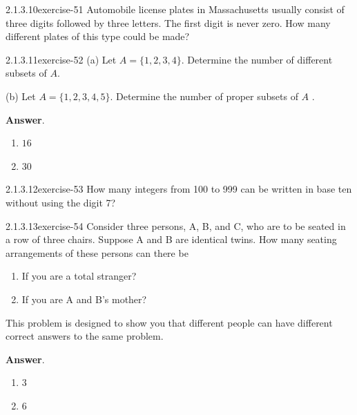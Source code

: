 \documentclass[twoside,10pt,]{book}
\numberwithin{equation}{section}
\begin{document}
\begin{divisionsolution}{2.1.3.10}{}{exercise-51}%
\hypertarget{p-599}{}%
Automobile license plates in Massachusetts usually consist of three digits followed by three letters. The first digit is never zero. How many different plates of this type could be made?%
\end{divisionsolution}%
\begin{divisionsolution}{2.1.3.11}{}{exercise-52}%
\hypertarget{p-600}{}%
(a) Let \(A = \{1, 2, 3, 4\}\). Determine the number of different subsets of \(A\).%
\par
\hypertarget{p-601}{}%
(b) Let \(A = \{1, 2, 3, 4, 5\}\). Determine the number of proper subsets of \(A\) .%
\par\smallskip%
\noindent\textbf{Answer}.\quad%
\hypertarget{p-602}{}%
\leavevmode%
\begin{multicols}{2}
\begin{enumerate}[label=(\alph*)]
\item\hypertarget{li-402}{}\hypertarget{p-603}{}%
\(16\)%
\item\hypertarget{li-403}{}\hypertarget{p-604}{}%
\(30\)%
\end{enumerate}
\end{multicols}
%
\end{divisionsolution}%
\begin{divisionsolution}{2.1.3.12}{}{exercise-53}%
\hypertarget{p-605}{}%
How many integers from 100 to 999 can be written in base ten without using the digit 7?%
\end{divisionsolution}%
\begin{divisionsolution}{2.1.3.13}{}{exercise-54}%
\hypertarget{p-606}{}%
Consider three persons, A, B, and C, who are to be seated in a row of three chairs. Suppose A and B are identical twins. How many seating arrangements of these persons can there be%
\par
\hypertarget{p-607}{}%
\leavevmode%
\begin{multicols}{2}
\begin{enumerate}[label=(\alph*)]
\item\hypertarget{li-404}{}\hypertarget{p-608}{}%
If you are a total stranger?%
\item\hypertarget{li-405}{}\hypertarget{p-609}{}%
If you are A and B's mother?%
\end{enumerate}
\end{multicols}
%
\par
\hypertarget{p-610}{}%
This problem is designed to show you that different people can have different correct answers to the same problem.%
\par\smallskip%
\noindent\textbf{Answer}.\quad%
\hypertarget{p-611}{}%
\leavevmode%
\begin{multicols}{2}
\begin{enumerate}[label=(\alph*)]
\item\hypertarget{li-406}{}\hypertarget{p-612}{}%
\(3\)%
\item\hypertarget{li-407}{}\hypertarget{p-613}{}%
\(6\)%
\end{enumerate}
\end{multicols}
%
\end{divisionsolution}%
\end{document}
